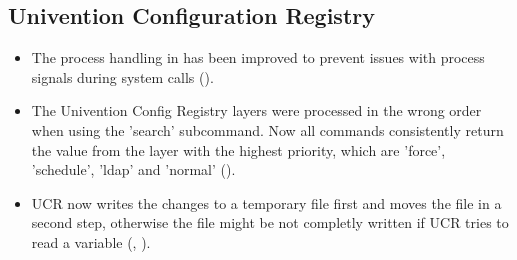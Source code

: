\subsection{Univention Configuration Registry}
\begin{itemize}
\item The process handling in  has been improved to prevent issues with process
  signals during system calls ().

\item The Univention Config Registry layers were processed in the wrong order when using the 'search' subcommand. Now all commands consistently return the value from the layer with the highest priority, which are 'force', 'schedule', 'ldap' and 'normal' ().

\item UCR now writes the changes to a temporary file first and moves the file
in a second step, otherwise the file might be not completly written if UCR
tries to read a variable (, ).
\end{itemize}






